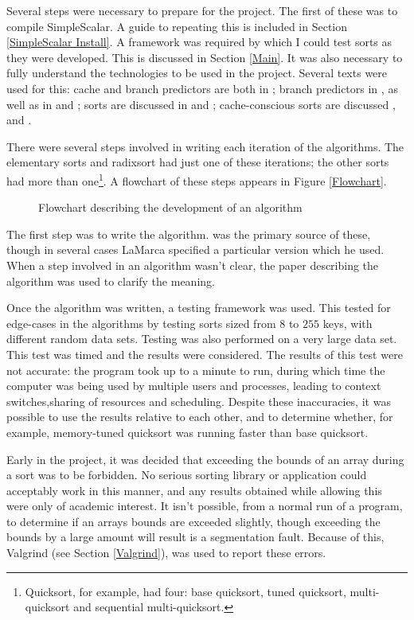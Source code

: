 Several steps were necessary to prepare for the project. The first of these was
to compile SimpleScalar. A guide to repeating this is included in Section
\ref{SimpleScalar Install}. A framework was required by which I could test sorts
as they were developed. This is discussed in Section \ref{Main}. It was also necessary
to fully understand the technologies to be used in the project. Several texts
were used for this: cache and branch predictors are both in
\cite{HennessyPatterson90}; branch predictors in
\cite{Uht97}, as well as in \cite{McFarling93}
and \cite{Smith81}; sorts are discussed in \cite{Sedgewick02} and
\cite{Knuth98}; cache-conscious sorts are discussed \cite{LaMarca96},
\cite{LaMarca99} and \cite{LaMarcaHeap96}.

There were several steps involved in writing each iteration of the algorithms.
The elementary sorts and radixsort had just one of these iterations; the other sorts had more
than one\footnote{Quicksort, for example, had four: base quicksort, tuned
quicksort, multi-quicksort and sequential multi-quicksort.}. A flowchart of these
steps appears in Figure \vref{Flowchart}.

\begin{figure}
\caption{Flowchart describing the development of an algorithm}
\label{Flowchart}
\end{figure}


The first step was to write the algorithm. \cite{Sedgewick02} was the primary
source of these, though in several cases LaMarca specified a particular version
which he used. When a step involved in an algorithm wasn't clear, the paper
describing the algorithm was used to clarify the meaning.

Once the algorithm was written, a testing framework was used. This tested for
edge-cases in the algorithms by testing sorts sized from $8$ to $255$ keys, with
different random data sets. Testing was also performed on a very large data set.
This test was timed and the results were considered. The results of this test
were not accurate: the program took up to a minute to run, during which time the
computer was being used by multiple users and processes, leading to context
switches,sharing of resources and scheduling. Despite these inaccuracies, it was
possible to use the results relative to each other, and to determine whether,
for example, memory-tuned quicksort was running faster than base quicksort.

Early in the project, it was decided that exceeding the bounds of an array
during a sort was to be forbidden. No serious sorting library or application
could acceptably work in this manner, and any results obtained while allowing
this were only of academic interest. It isn't possible, from a normal run of a
program, to determine if an arrays bounds are exceeded slightly, though exceeding
the bounds by a large amount will result is a segmentation fault. Because of
this, Valgrind (see Section \ref{Valgrind}), was used to report these errors.

